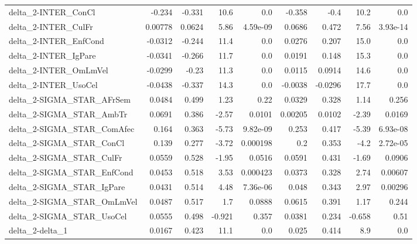 \begin{tabular}{lrrrrrrrr}
delta\_2-INTER\_ConCl                   &      -0.234 &       -0.331 &     10.6 &      0.0 &     -0.358 &        -0.4 &         10.2 &           0.0 \\
delta\_2-INTER\_CulFr                   &     0.00778 &       0.0624 &     5.86 & 4.59e-09 &     0.0686 &       0.472 &         7.56 &      3.93e-14 \\
delta\_2-INTER\_EnfCond                 &     -0.0312 &       -0.244 &     11.4 &      0.0 &     0.0276 &       0.207 &         15.0 &           0.0 \\
delta\_2-INTER\_IgPare                  &     -0.0341 &       -0.266 &     11.7 &      0.0 &     0.0191 &       0.148 &         15.3 &           0.0 \\
delta\_2-INTER\_OmLmVel                 &     -0.0299 &        -0.23 &     11.3 &      0.0 &     0.0115 &      0.0914 &         14.6 &           0.0 \\
delta\_2-INTER\_UsoCel                  &     -0.0438 &       -0.337 &     14.3 &      0.0 &    -0.0038 &     -0.0296 &         17.7 &           0.0 \\
delta\_2-SIGMA\_STAR\_AFrSem             &      0.0484 &        0.499 &     1.23 &     0.22 &     0.0329 &       0.328 &         1.14 &         0.256 \\
delta\_2-SIGMA\_STAR\_AmbTr              &      0.0691 &        0.386 &    -2.57 &   0.0101 &    0.00205 &      0.0102 &        -2.39 &        0.0169 \\
delta\_2-SIGMA\_STAR\_ComAfec            &       0.164 &        0.363 &    -5.73 & 9.82e-09 &      0.253 &       0.417 &        -5.39 &      6.93e-08 \\
delta\_2-SIGMA\_STAR\_ConCl              &       0.139 &        0.277 &    -3.72 & 0.000198 &        0.2 &       0.353 &         -4.2 &      2.72e-05 \\
delta\_2-SIGMA\_STAR\_CulFr              &      0.0559 &        0.528 &    -1.95 &   0.0516 &     0.0591 &       0.431 &        -1.69 &        0.0906 \\
delta\_2-SIGMA\_STAR\_EnfCond            &      0.0453 &        0.518 &     3.53 & 0.000423 &     0.0373 &       0.328 &         2.74 &       0.00607 \\
delta\_2-SIGMA\_STAR\_IgPare             &      0.0431 &        0.514 &     4.48 & 7.36e-06 &      0.048 &       0.343 &         2.97 &       0.00296 \\
delta\_2-SIGMA\_STAR\_OmLmVel            &      0.0487 &        0.517 &      1.7 &   0.0888 &     0.0615 &       0.391 &         1.17 &         0.244 \\
delta\_2-SIGMA\_STAR\_UsoCel             &      0.0555 &        0.498 &   -0.921 &    0.357 &     0.0381 &       0.234 &       -0.658 &          0.51 \\
delta\_2-delta\_1                       &      0.0167 &        0.423 &     11.1 &      0.0 &      0.025 &       0.414 &          8.9 &           0.0 \\
\bottomrule
\end{tabular}
